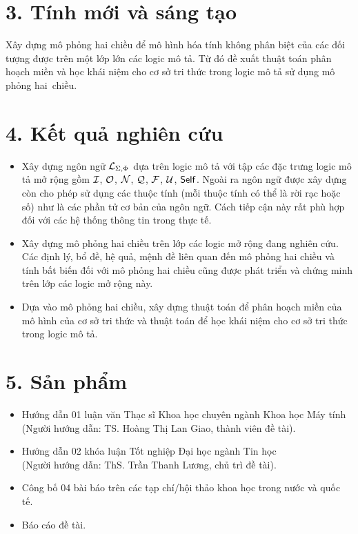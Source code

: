 \section*{3. Tính mới và sáng tạo}
Xây dựng mô phỏng hai chiều để mô hình hóa tính không phân biệt của các đối tượng được trên một lớp lớn các logic mô tả. Từ đó đề xuất thuật toán phân hoạch miền và học khái niệm cho cơ sở tri thức trong logic mô tả sử dụng mô phỏng hai~chiều.

\section*{4. Kết quả nghiên cứu}
\begin{itemize}
	\item Xây dựng ngôn ngữ $\mathcal{L}_{\Sigma,\Phi}$ dựa trên logic mô tả \ALCreg với tập các đặc trưng logic mô tả mở rộng gồm $\mathcal{I}$, $\mathcal{O}$, $\mathcal{N}$, $\mathcal{Q}$, $\mathcal{F}$, $\mathcal{U}$, $\mathsf{Self}$. Ngoài ra ngôn ngữ được xây dựng còn cho phép sử dụng các thuộc tính (mỗi thuộc tính có thể là rời rạc hoặc số) như là các phần tử cơ bản của ngôn ngữ. Cách tiếp cận này rất phù hợp đối với các hệ thống thông tin trong thực tế.
	
	\item Xây dựng mô phỏng hai chiều trên lớp các logic mở rộng đang nghiên cứu. Các định lý, bổ đề, hệ quả, mệnh đề liên quan đến mô phỏng hai chiều và tính bất biến đối với mô phỏng hai chiều cũng được phát triển và chứng minh trên lớp các logic mở rộng này.
	
	\item Dựa vào mô phỏng hai chiều, xây dựng thuật toán để phân hoạch miền của mô hình của cơ sở tri thức và thuật toán \BBCLearnS để học khái niệm cho cơ sở tri thức trong logic mô tả.
\end{itemize}
\section*{5. Sản phẩm}
\begin{itemize}
	\item Hướng dẫn 01 luận văn Thạc sĩ Khoa học chuyên ngành Khoa học Máy tính\\
	(Người hướng dẫn: TS. Hoàng Thị Lan Giao, thành viên đề tài).
	\item Hướng dẫn 02 khóa luận Tốt nghiệp Đại học ngành Tin học\\
	(Người hướng dẫn: ThS. Trần Thanh Lương, chủ trì đề tài).
	\item Công bố 04 bài báo trên các tạp chí/hội thảo khoa học trong nước và quốc tế.
	\item Báo cáo đề tài.
\end{itemize}
